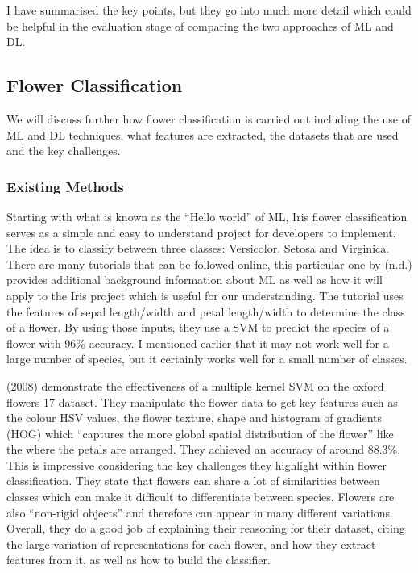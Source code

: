\documentclass{article}
\begin{document}
I have summarised the key points, but they go into much more detail which could be helpful in the evaluation stage 
of comparing the two approaches of ML and DL.

\subsection{Flower Classification}

We will discuss further how flower classification is carried out including the use of ML and DL techniques, what 
features are extracted, the datasets that are used and the key challenges.

\subsubsection{Existing Methods}

Starting with what is known as the “Hello world” of ML, Iris flower classification serves as a simple and easy to 
understand project for developers to implement. The idea is to classify between three classes: Versicolor, Setosa and 
Virginica. There are many tutorials that can be followed online, this particular one by \citeauthor{DataFlairND} (n.d.) 
provides additional background information about ML as well as how it will apply to the Iris project which is useful for
our understanding. The tutorial uses the features of sepal length/width and petal length/width to determine the class of
a flower. By using those inputs, they use a SVM to predict the species of a flower with 96\% accuracy. I mentioned 
earlier that it may not work well for a large number of species, but it certainly works well for a small number of 
classes.

\par

\citeauthor{Nilsback2008} (2008) demonstrate the effectiveness of a multiple kernel SVM on the oxford flowers 17 dataset. 
They manipulate the flower data to get key features such as the colour HSV values, the flower texture, shape and 
histogram of gradients (HOG) which “captures the more global spatial distribution of the flower” like the where the 
petals are arranged. They achieved an accuracy of around 88.3\%. This is impressive considering the key challenges they 
highlight within flower classification. They state that flowers can share a lot of similarities between classes which 
can make it difficult to differentiate between species. Flowers are also “non-rigid objects” and therefore can appear in
many different variations. Overall, they do a good job of explaining their reasoning for their dataset, citing the 
large variation of representations for each flower, and how they extract features from it, as well as how to build the
classifier.
\end{document}

